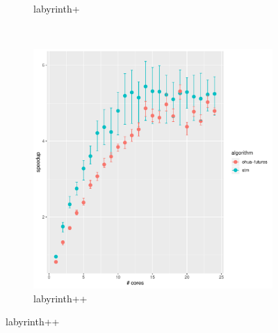 \begin{figure}
\begin{subfigure}[t]{.32\textwidth}
        \caption{labyrinth+}%
    \end{subfigure}%
    ~
    \begin{subfigure}[t]{.32\textwidth}
        \includegraphics[width=\textwidth,keepaspectratio]{gfx/results/labyrinth/labyrinth++}
        \caption{labyrinth++}%
    \end{subfigure}%


\end{figure}
